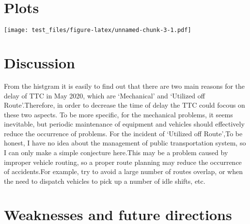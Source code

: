 \documentclass[
]{article}
\newenvironment{Shaded}{\begin{snugshade}}{\end{snugshade}}
\newcommand{\DataTypeTok}[1]{\textcolor[rgb]{0.13,0.29,0.53}{#1}}
\newcommand{\DecValTok}[1]{\textcolor[rgb]{0.00,0.00,0.81}{#1}}
\newcommand{\KeywordTok}[1]{\textcolor[rgb]{0.13,0.29,0.53}{\textbf{#1}}}
\newcommand{\NormalTok}[1]{#1}
\newcommand{\OperatorTok}[1]{\textcolor[rgb]{0.81,0.36,0.00}{\textbf{#1}}}
\newcommand{\StringTok}[1]{\textcolor[rgb]{0.31,0.60,0.02}{#1}}
\begin{document}
\hypertarget{plots}{%
\section{Plots}\label{plots}}

\begin{Shaded}
\end{Shaded}

\texttt{[image: test\_files/figure-latex/unnamed-chunk-3-1.pdf]}

\hypertarget{discussion}{%
\section{Discussion}\label{discussion}}

From the histgram it is easily to find out that there are two main
reasons for the delay of TTC in May 2020, which are `Mechanical' and
`Utilized off Route'.Therefore, in order to decrease the time of delay
the TTC could focous on these two aspects. To be more specific, for the
mechanical problems, it seems inevitable, but periodic maintenance of
equipment and vehicles should effectively reduce the occurrence of
problems. For the incident of `Utilized off Route',To be honest, I have
no idea about the management of public transportation system, so I can
only make a simple conjecture here.This may be a problem caused by
improper vehicle routing, so a proper route planning may reduce the
occurrence of accidents.For example, try to avoid a large number of
routes overlap, or when the need to dispatch vehicles to pick up a
number of idle shifts, etc.

\hypertarget{weaknesses-and-future-directions}{%
\section{Weaknesses and future
directions}\label{weaknesses-and-future-directions}}
\end{document}
